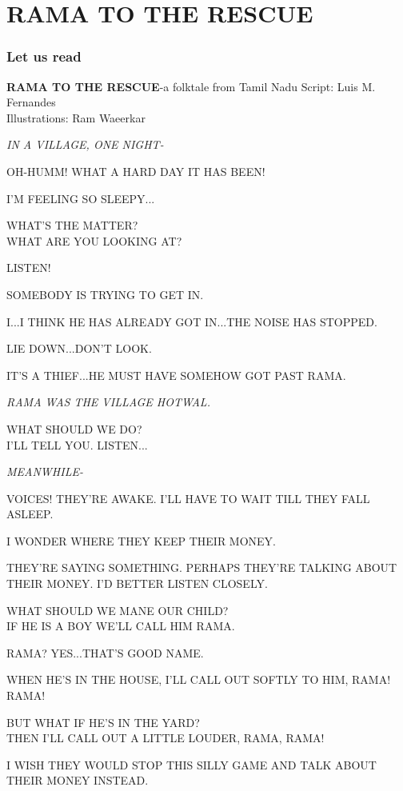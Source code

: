 \chapter{RAMA TO THE RESCUE}
\subsection{Let us read}
\textbf{RAMA TO THE RESCUE}-a folktale from Tamil Nadu
\hspace{0.2in}
Script: Luis M. Fernandes\\
Illustrations: Ram Waeerkar
\par
\textit{IN A VILLAGE, ONE NIGHT-}
\par
OH-HUMM! WHAT A HARD DAY IT HAS BEEN!
\par
I'M FEELING SO SLEEPY...
\par
WHAT'S THE MATTER?\\
WHAT ARE YOU LOOKING AT?
\par
LISTEN!
\par
SOMEBODY IS TRYING TO GET IN.
\par
I...I THINK HE HAS ALREADY GOT IN...THE NOISE HAS STOPPED.
\par
LIE DOWN...DON'T LOOK.
\par
IT'S A THIEF...HE MUST HAVE SOMEHOW GOT PAST RAMA.
\par
\textit{RAMA WAS THE VILLAGE HOTWAL.}
\par
WHAT SHOULD WE DO?\\
I'LL TELL YOU. LISTEN...
\par
\textit{MEANWHILE-}
\par
VOICES! THEY'RE AWAKE. I'LL HAVE TO WAIT TILL THEY FALL ASLEEP.
\par
I WONDER WHERE THEY KEEP THEIR MONEY.
\par
THEY'RE SAYING SOMETHING. PERHAPS THEY'RE TALKING ABOUT THEIR MONEY. I'D BETTER LISTEN CLOSELY.
\par
WHAT SHOULD WE MANE OUR CHILD?\\
IF HE IS A BOY WE'LL CALL HIM RAMA.
\par
RAMA? YES...THAT'S GOOD NAME.
\par
WHEN HE'S IN THE HOUSE, I'LL CALL OUT SOFTLY TO HIM, RAMA! RAMA!
\par
BUT WHAT IF HE'S IN THE YARD?\\
THEN I'LL CALL OUT A LITTLE LOUDER, RAMA, RAMA!
\par
I WISH THEY WOULD STOP THIS SILLY GAME AND TALK ABOUT THEIR MONEY INSTEAD.
\par
